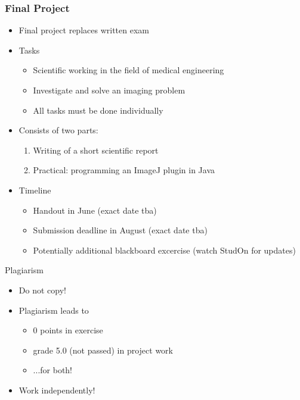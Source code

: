 \begin{frame}
	\frametitle{Final Project}
	\begin{itemize}
		\item Final project replaces written exam
		\item Tasks
		\begin{itemize}
			\item Scientific working in the field of medical engineering
			\item Investigate and solve an imaging problem
			\item All tasks must be done individually
		\end{itemize}
		\item Consists of two parts:
		\begin{enumerate}
			\item Writing of a short scientific report
			\item Practical: programming an ImageJ plugin in Java
		\end{enumerate}
		\item Timeline
		\begin{itemize}
			\item Handout in June (exact date tba)
			\item Submission deadline in August (exact date tba)
			\item Potentially additional blackboard excercise (watch StudOn for updates)
		\end{itemize}
	\end{itemize}
\end{frame}

\begin{frame}[c]{Plagiarism}
	\begin{itemize}
		\setlength\itemsep{0.4cm}
		\item Do not copy!
		\item Plagiarism leads to
		\begin{itemize}
			\item 0 points in exercise
			\item grade 5.0 (not passed) in project work
			\item ...for both!
		\end{itemize}
		\item Work independently!
	\end{itemize}
\end{frame}


